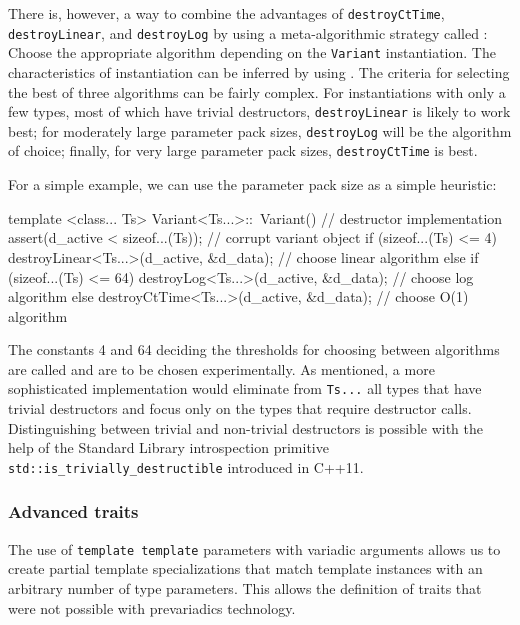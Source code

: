 There is, however, a way to combine the advantages of
\lstinline!destroyCtTime!, \lstinline!destroyLinear!, and \lstinline!destroyLog!
by using a meta-algorithmic strategy called : Choose the appropriate algorithm depending on the
\lstinline!Variant! instantiation. The characteristics of instantiation can
be inferred by using . The criteria
for selecting the best of three algorithms can be fairly complex. For
instantiations with only a few types, most of which have trivial
destructors, \lstinline!destroyLinear! is likely to work best; for
moderately large parameter pack sizes, \lstinline!destroyLog! will be the
algorithm of choice; finally, for very large parameter pack sizes,
\lstinline!destroyCtTime! is best.

For a simple example, we can use the parameter pack size as a simple
heuristic:

\begin{emcppslisting}
template <class... Ts>
Variant<Ts...>::~Variant()                        // destructor implementation
{
    assert(d_active < sizeof...(Ts));             // corrupt variant object
    if (sizeof...(Ts) <= 4)
        destroyLinear<Ts...>(d_active, &d_data);  // choose linear algorithm
    else if (sizeof...(Ts) <= 64)
        destroyLog<Ts...>(d_active, &d_data);     // choose log algorithm
    else
        destroyCtTime<Ts...>(d_active, &d_data);  // choose O(1) algorithm
}
\end{emcppslisting}
    

\noindent The constants 4 and 64 deciding the thresholds for choosing between
algorithms are called  and are to be chosen
experimentally. As mentioned, a more sophisticated implementation would
eliminate from \lstinline!Ts...! all types that have trivial destructors
and focus only on the types that require destructor calls.
Distinguishing between trivial and non-trivial destructors is possible
with the help of the Standard Library introspection primitive
\lstinline!std::is_trivially_destructible! introduced in C++11.

\subsubsection[Advanced traits]{Advanced traits}\label{advanced-traits}

The use of \lstinline!template!~\lstinline!template! parameters with variadic
arguments allows us to create partial template specializations that
match template instances with an arbitrary number of type parameters.
This allows the definition of traits that were not possible with
prevariadics technology.

